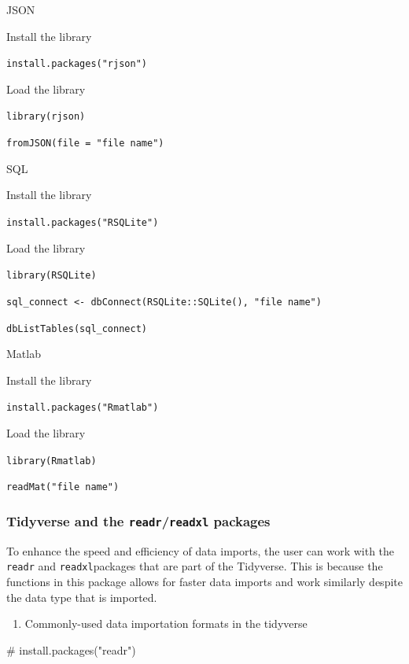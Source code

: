 \documentclass[
  letterpaper,
  DIV=11,
  numbers=noendperiod]{scrreprt}
\newenvironment{Shaded}{\begin{snugshade}}{\end{snugshade}}
\newcommand{\CommentTok}[1]{\textcolor[rgb]{0.37,0.37,0.37}{#1}}
\providecommand{\tightlist}{%
  \setlength{\itemsep}{0pt}\setlength{\parskip}{0pt}}\usepackage{longtable,booktabs,array}
\begin{document}
JSON

Install the library

\texttt{install.packages("rjson")}

Load the library

\texttt{library(rjson)}

\texttt{fromJSON(file\ =\ "file\ name")}

SQL

Install the library

\texttt{install.packages("RSQLite")}

Load the library

\texttt{library(RSQLite)}

\texttt{sql\_connect\ \textless{}-\ dbConnect(RSQLite::SQLite(),\ "file\ name")}

\texttt{dbListTables(sql\_connect)}

Matlab

Install the library

\texttt{install.packages("Rmatlab")}

Load the library

\texttt{library(Rmatlab)}

\texttt{readMat("file\ name")}

\subsubsection{\texorpdfstring{Tidyverse and the
\texttt{readr}/\texttt{readxl}
packages}{Tidyverse and the readr/readxl packages}}\label{tidyverse-and-the-readrreadxl-packages}

To enhance the speed and efficiency of data imports, the user can work
with the \texttt{readr} and \texttt{readxl}packages that are part of the
Tidyverse. This is because the functions in this package allows for
faster data imports and work similarly despite the data type that is
imported.

\begin{enumerate}
\def\labelenumi{\arabic{enumi}.}
\tightlist
\item
  Commonly-used data importation formats in the tidyverse
\end{enumerate}

\begin{Shaded}
\begin{Highlighting}[]
\CommentTok{\# install.packages("readr")}
\end{Highlighting}
\end{Shaded}
\end{document}
